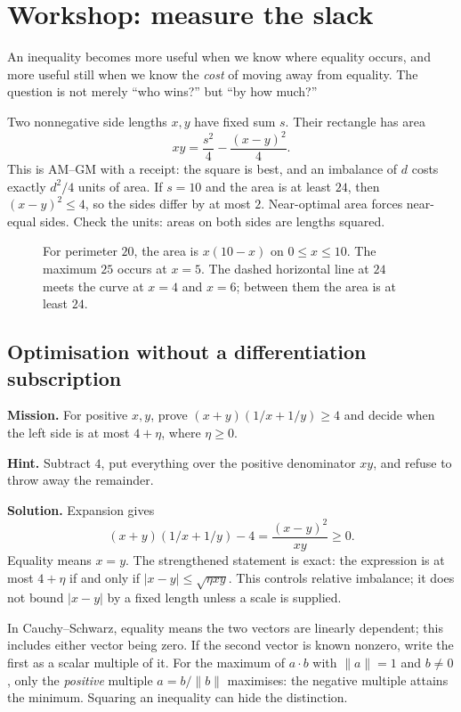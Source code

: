 \section{Workshop: measure the slack}
An inequality becomes more useful when we know where equality occurs, and more useful still when we know the \emph{cost} of moving away from equality. The question is not merely ``who wins?'' but ``by how much?''

\begin{examplex}
Two nonnegative side lengths $x,y$ have fixed sum $s$. Their rectangle has area
\[
xy=\frac{s^2}{4}-\frac{(x-y)^2}{4}.
\]
This is AM--GM with a receipt: the square is best, and an imbalance of $d$ costs exactly $d^2/4$ units of area. If $s=10$ and the area is at least $24$, then $(x-y)^2\le4$, so the sides differ by at most $2$. Near-optimal area forces near-equal sides. Check the units: areas on both sides are lengths squared.
\end{examplex}

\begin{figure}[ht]\centering{}
\caption{For perimeter $20$, the area is $x(10-x)$ on $0\le x\le10$. The maximum $25$ occurs at $x=5$. The dashed horizontal line at $24$ meets the curve at $x=4$ and $x=6$; between them the area is at least $24$.}\end{figure}

\subsection*{Optimisation without a differentiation subscription}
\textbf{Mission.} For positive $x,y$, prove $(x+y)(1/x+1/y)\ge4$ and decide when the left side is at most $4+\eta$, where $\eta\ge0$.

\textbf{Hint.} Subtract $4$, put everything over the positive denominator $xy$, and refuse to throw away the remainder.

\textbf{Solution.} Expansion gives
\[
(x+y)(1/x+1/y)-4=\frac{(x-y)^2}{xy}\ge0.
\]
Equality means $x=y$. The strengthened statement is exact: the expression is at most $4+\eta$ if and only if $|x-y|\le\sqrt{\eta xy}$. This controls relative imbalance; it does not bound $|x-y|$ by a fixed length unless a scale is supplied.

\begin{reminder}
In Cauchy--Schwarz, equality means the two vectors are linearly dependent; this includes either vector being zero. If the second vector is known nonzero, write the first as a scalar multiple of it. For the maximum of $a\cdot b$ with $\|a\|=1$ and $b\ne0$, only the \emph{positive} multiple $a=b/\|b\|$ maximises: the negative multiple attains the minimum. Squaring an inequality can hide the distinction.
\end{reminder}


